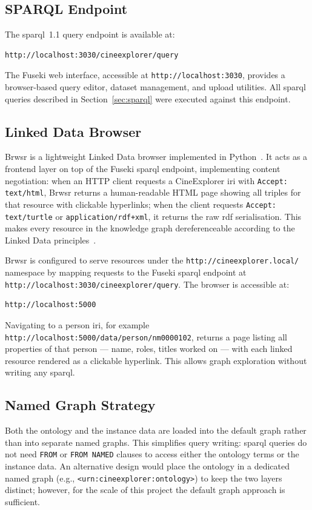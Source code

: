 \subsection{SPARQL Endpoint}

The \ac{sparql}~1.1 query endpoint is available at:

\begin{verbatim}
http://localhost:3030/cineexplorer/query
\end{verbatim}

The Fuseki web interface, accessible at \texttt{http://localhost:3030}, provides a browser-based query editor, dataset management, and upload utilities. All \ac{sparql} queries described in Section~\ref{sec:sparql} were executed against this endpoint.

\subsection{Linked Data Browser}

Brwsr is a lightweight Linked Data browser implemented in Python~\cite{brwsr}. It acts as a frontend layer on top of the Fuseki \ac{sparql} endpoint, implementing content negotiation: when an HTTP client requests a CineExplorer \ac{iri} with \texttt{Accept: text/html}, Brwsr returns a human-readable HTML page showing all triples for that resource with clickable hyperlinks; when the client requests \texttt{Accept: text/turtle} or \texttt{application/rdf+xml}, it returns the raw \ac{rdf} serialisation. This makes every resource in the knowledge graph dereferenceable according to the Linked Data principles~\cite{cooluris}.

Brwsr is configured to serve resources under the \texttt{http://cineexplorer.local/} namespace by mapping requests to the Fuseki \ac{sparql} endpoint at \texttt{http://localhost:3030/cineexplorer/query}. The browser is accessible at:

\begin{verbatim}
http://localhost:5000
\end{verbatim}

Navigating to a person \ac{iri}, for example \texttt{http://localhost:5000/data/person/nm0000102}, returns a page listing all properties of that person — name, roles, titles worked on — with each linked resource rendered as a clickable hyperlink. This allows graph exploration without writing any \ac{sparql}.

\subsection{Named Graph Strategy}

Both the ontology and the instance data are loaded into the default graph rather than into separate named graphs. This simplifies query writing: \ac{sparql} queries do not need \texttt{FROM} or \texttt{FROM NAMED} clauses to access either the ontology terms or the instance data. An alternative design would place the ontology in a dedicated named graph (e.g., \texttt{<urn:cineexplorer:ontology>}) to keep the two layers distinct; however, for the scale of this project the default graph approach is sufficient.
